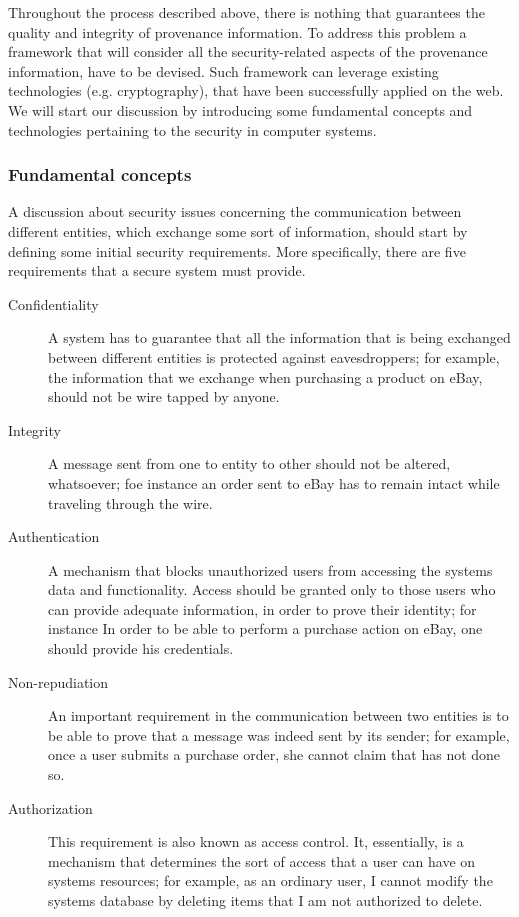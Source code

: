 Throughout the process described above, there is nothing that guarantees the quality and integrity of provenance information. To address this problem a framework that will consider all the security-related aspects of the provenance information, have to be devised. Such framework can leverage existing technologies (e.g. cryptography), that have been successfully applied on the web.
We will start our discussion by introducing some fundamental concepts and technologies pertaining to the security in computer systems.

\subsubsection{Fundamental concepts}

A discussion about security issues concerning the communication between different entities, which exchange some sort of information, should start by defining some initial security requirements. More specifically, there are five requirements that a secure system must provide.

\begin{description}
  \item[Confidentiality] 
        A system has to guarantee that all the information that is being exchanged between different entities is protected against eavesdroppers; for example, the information that we exchange when purchasing a product on eBay, should not be wire tapped by anyone.
  \item[Integrity] 
        A message sent from one to entity to other should not be altered, whatsoever; foe instance an order sent to eBay has to remain intact while traveling through the wire.
  \item[Authentication] 
        A mechanism that blocks unauthorized users from accessing the systems data and functionality. Access should be granted only to those users who can provide adequate information, in order to prove their identity; for instance In order to be able to perform a purchase action on eBay, one should provide his credentials.
  \item[Non-repudiation] 
        An important requirement in the communication between two entities is to be able to prove that a message was indeed sent by its sender; for example, once a user submits a purchase order, she cannot claim that has not done so.
  \item[Authorization] 
        This requirement is also known as access control. It, essentially, is a mechanism that determines the sort of access that a user can have on systems resources; for example, as an ordinary user, I cannot modify the systems database by deleting items that I am not authorized to delete.
\end{description}

